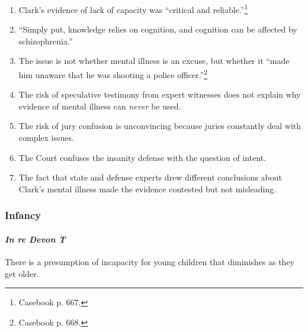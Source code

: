 \begin{enumerate}
    \begin{enumerate}
        \item Clark's evidence of lack of capacity was ``critical and 
        reliable.''\footnote{Casebook p. 667.}
        \item ``Simply put, knowledge relies on cognition, and cognition can 
        be affected by schizophrenia.''
        \item The issue is not whether mental illness is an excuse, but 
        whether it ``made him unaware that he was shooting a police 
        officer.''\footnote{Casebook p. 668.}
        \item The risk of speculative testimony from expert witnesses does not 
        explain why evidence of mental illness can \emph{never} be used.
        \item The risk of jury confusion is unconvincing because juries 
        constantly deal with complex issues.
        \item The Court confuses the insanity defense with the question of 
        intent.
        \item The fact that state and defense experts drew different 
        conclusions about Clark's mental illness made the evidence contested 
        but not misleading.
    \end{enumerate}
\end{enumerate}

\subsubsection{Infancy}

\paragraph{\emph{In re Devon T}}

There is a presumption of incapacity for young children that diminishes as 
they get older.


